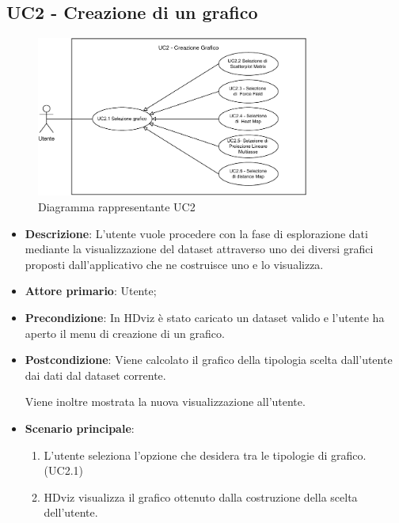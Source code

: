 \newpage

\subsection{UC2 - Creazione di un grafico}
\label{sub:uc2}

\begin{figure}[h]
    \centering
    \includegraphics[width=0.8\textwidth]{componenti/casi-duso/diagrammi/UC2.pdf}
    \caption{Diagramma rappresentante UC2}
    \label{fig:UC2}
\end{figure}


\begin{itemize}
    \item \textbf{Descrizione}: L’utente vuole procedere con la fase di esplorazione
                                dati mediante la visualizzazione del dataset
                                attraverso uno dei diversi grafici proposti dall’applicativo
                                che ne costruisce uno e lo visualizza.
	
    \item \textbf{Attore primario}: Utente;
    
    \item \textbf{Precondizione}:   In HDviz è stato caricato un dataset valido e
									l'utente ha aperto il menu di creazione di un grafico.

    \item \textbf{Postcondizione}:  Viene calcolato il grafico della tipologia scelta dall'utente dai dati 
									dal dataset corrente. 
									
									Viene inoltre mostrata la nuova visualizzazione all'utente.

	\item \textbf{Scenario principale}:
		\begin{enumerate}
			\item L'utente seleziona l'opzione che desidera tra le tipologie di grafico. (UC2.1)
			\item HDviz visualizza il grafico ottenuto dalla costruzione della scelta dell'utente.
		\end{enumerate}
\end{itemize}

